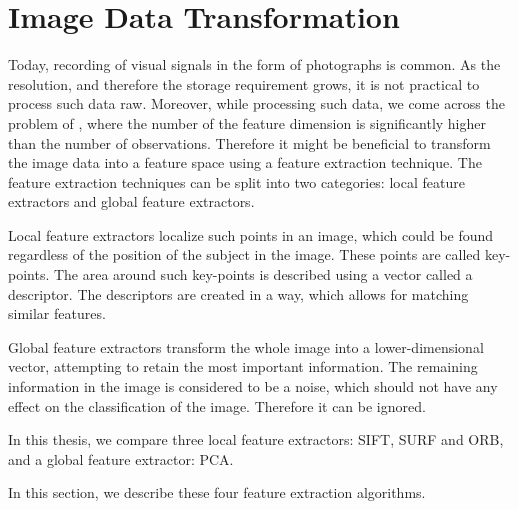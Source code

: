 \chapter{Image Data Transformation}

Today, recording of visual signals in the form of photographs is common. As the resolution, and therefore the storage requirement grows, it is not practical to process such data raw. Moreover, while processing such data, we come across the problem of , where the number of the feature dimension is significantly higher than the number of observations. Therefore it might be beneficial to transform the image data into a feature space using a feature extraction technique. The feature extraction techniques can be split into two categories: local feature extractors and global feature extractors\cite{lee2005}.

Local feature extractors localize such points in an image, which could be found regardless of the position of the subject in the image. These points are called key-points. The area around such key-points is described using a vector called a descriptor. The descriptors are created in a way, which allows for matching similar features.

Global feature extractors transform the whole image into a lower-dimensional vector, attempting to retain the most important information. The remaining information in the image is considered to be a noise, which should not have any effect on the classification of the image. Therefore it can be ignored.

In this thesis, we compare three local feature extractors: SIFT, SURF and ORB, and a global feature extractor: PCA.

In this section, we describe these four feature extraction algorithms.











